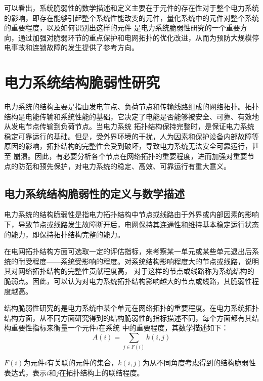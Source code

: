 可以看出，系统脆弱性的数学描述和定义主要在于元件的存在性对于整个电力系统的影响，即存在能够引起整个系统性能改变的元件，量化系统中的元件对整个系统的重要程度，以及如何识别出这样的元件
是电力系统脆弱性研究的一个重要方向，通过加强对脆弱环节的重点保护和电网拓扑的优化改进，从而为预防大规模停电事故和连锁故障的发生提供了参考方向。


\section{电力系统结构脆弱性研究}
\label{sec:construction}

电力系统的结构主要是指由发电节点、负荷节点和传输线路组成的网络拓扑。拓扑结构是电能传输和系统性能的基础，它决定了电能是否能够被安全、可靠、有效地从发电节点传输到负荷节点。当电力系统
拓扑结构保持完整时，是保证电力系统稳定可靠运行的基础。但是，受外界环境的干扰，人为因素和保护设备内部故障等原因的影响，拓扑结构的完整性会受到破坏，导致电力系统无法安全可靠运行，甚至
崩溃。因此，有必要分析各个节点在网络拓扑的重要程度，进而加强对重要节点的防范和预先保护，对电力系统的稳定、高效、可靠运行有重大意义。

\subsection{电力系统结构脆弱性的定义与数学描述}
\label{sec:network}

电力系统的结构脆弱性是指电力拓扑结构中节点或线路由于外界或内部因素的影响下，导致节点或线路发生故障断开后，电网保持其连通性和维持基本稳定运行状态的能力，即保持拓扑结构完整的能力。

在电网拓扑结构方面可选取一定的评估指标，来考察某一单元或某些单元退出后系统的耐受程度——系统受影响的程度。对系统结构影响程度大的节点或线路，说明其对网络拓扑结构的完整性贡献程度高，
对于这样的节点或线路称为系统结构的脆弱点。因此，可以认为对电力系统拓扑结构影响越大的节点或线路，其脆弱性程度越高。

结构脆弱性研究的是电力系统中某个单元在网络拓扑的重要程度。在电力系统拓扑结构方面，从不同方面研究得到的结构脆弱性的指标描述不同，每个方面都有其结构重要性指标来衡量一个元件$i$在系统
中的重要程度，其数学描述如下：
\begin{equation}
  A(i)=\sum_{j\in F(i)}{k(i,j)}
  \end{equation}

$F(i)$为元件$i$有关联的元件的集合，$k(i,j)$为从不同角度考虑得到的结构脆弱性表达式，表示$i$和$j$在拓扑结构上的联结程度。



